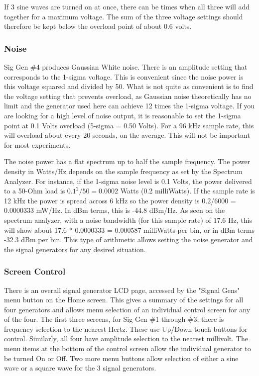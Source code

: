 If 3 sine waves are turned on at once, there can be times when all three will add together for a maximum voltage.  The sum of the three voltage settings should therefore be kept below the overload point of about 0.6 volts.

\subsubsection{Noise}
Sig Gen \#4 produces Gaussian White noise.  There is an amplitude setting that corresponds to the 1-sigma voltage.  This is convenient since the noise power is this voltage squared and divided by 50.  What is not quite as convenient is to find the voltage setting that prevents overload, as Gaussian noise theoretically has no limit and the generator used here can achieve 12 times the 1-sigma voltage.  If you are looking for a high level of noise output, it is reasonable to set the 1-sigma point at 0.1 Volts overload (5-sigma = 0.50 Volts). For a 96 kHz sample rate, this will overload about every 20 seconds, on the average.  This will not be important for most experiments.

The noise power has a flat spectrum up to half the sample frequency.  The power density in Watts/Hz depends on the sample frequency as set by the Spectrum Analyzer.  For instance, if the 1-sigma noise level is 0.1 Volts, the power delivered to a 50-Ohm load is $0.1^2/50 = 0.0002$ Watts (0.2 milliWatts).   If the sample rate is 12 kHz the power is spread across 6 kHz so the power density is 0.2/6000 = 0.0000333 mW/Hz.  In dBm terms, this is -44.8 dBm/Hz.  As seen on the spectrum analyzer, with a noise bandwidth (for this sample rate) of 17.6 Hz, this will show about 17.6 * 0.0000333 = 0.000587 milliWatts per bin, or in dBm terms -32.3 dBm per bin.   This type of arithmetic allows setting the noise generator and the signal generators for any desired situation.

\subsubsection{Screen Control}
There is an overall signal generator LCD page, accessed by the "Signal Gens" menu button on the Home screen.  This gives a summary of the settings for all four generators and allows menu selection of an individual control screen for any of the four.  The first three screens, for Sig Gen \#1 through \#3, there is frequency selection to the nearest Hertz.  These use Up/Down touch buttons for control.  Similarly, all four have amplitude selection to the nearest millivolt.  The menu items at the bottom of the control screen allow the individual generator to be turned On or Off.  Two more  menu buttons allow selection of either a sine wave or a square wave for the 3 signal generators.

